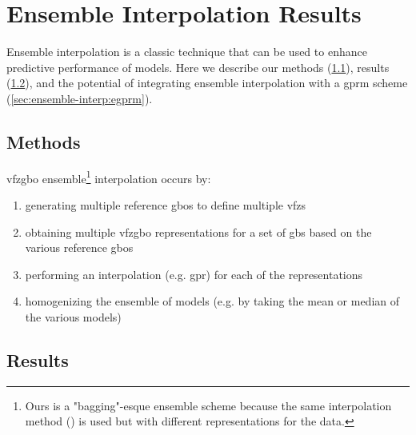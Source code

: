 \documentclass[preprint,12pt]{elsarticle}
\begin{document}
\section{Ensemble Interpolation Results}
\label{sec:ensemble-interp}
Ensemble interpolation is a classic technique that can be used to enhance predictive performance of models. Here we describe our methods (\cref{sec:ensemble-interp:methods}), results (\cref{sec:ensemble-interp:results}), and the potential of integrating ensemble interpolation with a \gls{gprm} scheme (\cref{sec:ensemble-interp:egprm}).

\subsection{Methods}
\label{sec:ensemble-interp:methods}
\Gls{vfzgbo} ensemble\footnote{Ours is a "bagging"-esque ensemble scheme because the same interpolation method () is used but with different representations for the \inpt{} data. } interpolation occurs by:
\begin{enumerate}
    \item generating multiple reference \glspl{gbo} to define multiple \glspl{vfz}
    \item obtaining multiple \gls{vfzgbo} representations for a set of \glspl{gb} based on the various reference \glspl{gbo}
    \item performing an interpolation (e.g. \gls{gpr}) for each of the representations
    \item homogenizing the ensemble of models (e.g. by taking the mean or median of the various models)
\end{enumerate}

\subsection{Results}
\label{sec:ensemble-interp:results}
\end{document}
